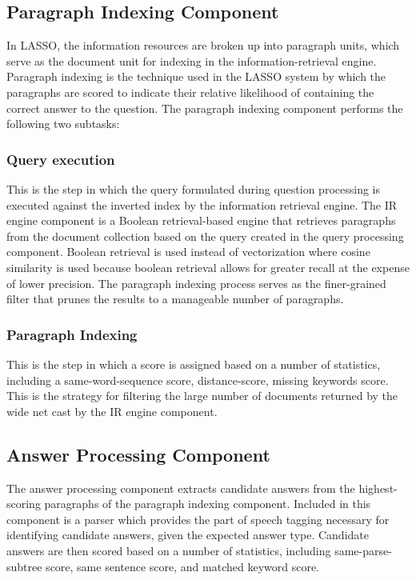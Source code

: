 \subsection{Paragraph Indexing Component}

In LASSO, the information resources are broken up into paragraph units, which serve as the document unit for indexing in the information-retrieval engine.  Paragraph indexing is the technique used in the LASSO system by which the paragraphs are scored to indicate their relative likelihood of containing the correct answer to the question.  The paragraph indexing component performs the following two subtasks:

\subsubsection{Query execution}

This is the step in which the query formulated during question processing is executed against the inverted index by the information retrieval engine.  The IR engine component is a Boolean retrieval-based engine that retrieves paragraphs from the document collection based on the query created in the query processing component.  Boolean retrieval is used instead of vectorization where cosine similarity is used because boolean retrieval allows for greater recall at the expense of lower precision.  The paragraph indexing process serves as the finer-grained filter that prunes the results to a manageable number of paragraphs.

\subsubsection{Paragraph Indexing}

This is the step in which a score is assigned based on a number of statistics, including a same-word-sequence score, distance-score, missing keywords score.  This is the strategy for filtering the large number of documents returned by the wide net cast by the IR engine component.

\subsection{Answer Processing Component}

The answer processing component extracts candidate answers from the highest-scoring paragraphs of the paragraph indexing component.  Included in this component is a parser which provides the part of speech tagging necessary for identifying candidate answers, given the expected answer type.  Candidate answers are then scored based on a number of statistics, including same-parse-subtree score, same sentence score, and matched keyword score.


